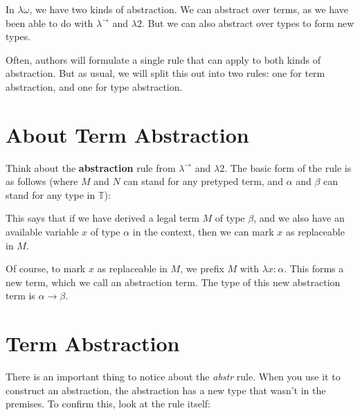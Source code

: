 \documentclass{book}
\numberwithin{equation}{chapter}
\newcommand{\vocab}{\textbf}
\begin{document}
In $\lambda\omega$, we have two kinds of abstraction. We can abstract over terms, as we have been able to do with $\lambda^{\rightarrow}$ and $\lambda2$. But we can also abstract over types to form new types.

Often, authors will formulate a single rule that can apply to both kinds of abstraction. But as usual, we will split this out into two rules: one for term abstraction, and one for type abstraction.


\section{About Term Abstraction}

Think about the \vocab{abstraction} rule from $\lambda^{\rightarrow}$ and $\lambda2$. The basic form of the rule is as follows (where $M$ and $N$ can stand for any pretyped term, and $\alpha$ and $\beta$ can stand for any type in $\mathbb{T}$):

\begin{prooftree}
\end{prooftree}

\noindent
This says that if we have derived a legal term $M$ of type $\beta$, and we also have an available variable $x$ of type $\alpha$ in the context, then we can mark $x$ as replaceable in $M$.

Of course, to mark $x$ as replaceable in $M$, we prefix $M$ with $\lambda x : \alpha$. This forms a new term, which we call an abstraction term. The type of this new abstraction term is $\alpha \rightarrow \beta$.


\section{Term Abstraction}

There is an important thing to notice about the \textit{abstr} rule. When you use it to construct an abstraction, the abstraction has a new type that wasn't in the premises. To confirm this, look at the rule itself:

\begin{prooftree}
\end{prooftree}
\end{document}
